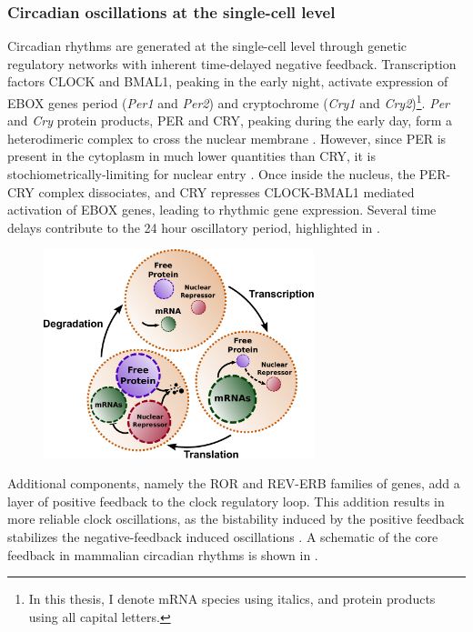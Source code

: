 \subsubsection{Circadian oscillations at the single-cell level}
Circadian rhythms are generated at the single-cell level through genetic regulatory networks with inherent time-delayed negative feedback. 
Transcription factors CLOCK and BMAL1, peaking in the early night, activate expression of EBOX genes period ({\itshape Per1} and {\itshape Per2}) and cryptochrome ({\itshape Cry1} and {\itshape Cry2})\footnote{In this thesis, I denote mRNA species using italics, and protein products using all capital letters.}.
{\itshape Per} and {\itshape Cry} protein products, PER and CRY, peaking during the early day, form a heterodimeric complex to cross the nuclear membrane \cite{Ko2006}. 
However, since PER is present in the cytoplasm in much lower quantities than CRY, it is stochiometrically-limiting for nuclear entry \cite{Lee2001}. 
Once inside the nucleus, the PER-CRY complex dissociates, and CRY represses CLOCK-BMAL1 mediated activation of EBOX genes, leading to rhythmic gene expression.
Several time delays contribute to the 24 hour oscillatory period, highlighted in .

\begin{figure}[tbp]
  \centering
  \includegraphics[width=0.7\textwidth]{chap1/figures/maindelays.pdf}
  \label{fig:maindelays}
\end{figure}

Additional components, namely the ROR and REV-ERB families of genes, add a layer of positive feedback to the clock regulatory loop.
This addition results in more reliable clock oscillations, as the bistability induced by the positive feedback stabilizes the negative-feedback induced oscillations \cite{Ananthasubramaniam2014a}.
A schematic of the core feedback in mammalian circadian rhythms is shown in .

